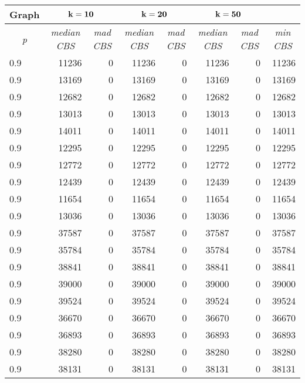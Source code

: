 \documentclass{scrartcl}
\theoremstyle{plain}
\newcommand{\cbs}{CBS}
\begin{document}
\begin{table}[!ht]
	\centering
	\scriptsize
	\begin{tabular}{|l|rr|rr|rr|r|}
	\hline
\multicolumn{1}{|c|}{\textbf{Graph}} & \multicolumn{2}{c|}{$\bf{k=10}$} & 
\multicolumn{2}{c|}{$\bf{k=20}$} &  \multicolumn{2}{c|}{$\bf{k=50}$} & \\ 
\hline	

\multicolumn{1}{|c|}{\emph{p}} &
\multicolumn{1}{c}{\emph{median \cbs{}}} & \multicolumn{1}{c|}{\emph{mad 
\cbs{}}} &
\multicolumn{1}{c}{\emph{median \cbs{}}} & \multicolumn{1}{c|}{\emph{mad 
\cbs{}}} &
\multicolumn{1}{c}{\emph{median \cbs{}}} & \multicolumn{1}{c|}{\emph{mad 
\cbs{}}} &
\multicolumn{1}{|c|}{\emph{min \cbs{}}}

\\ \hline

\makeatletter{}0.9 & 11236 & 0 & 11236 & 0 & 11236 & 0 & 11236 \\ 
0.9 & 13169 & 0 & 13169 & 0 & 13169 & 0 & 13169 \\ 
0.9 & 12682 & 0 & 12682 & 0 & 12682 & 0 & 12682 \\ 
0.9 & 13013 & 0 & 13013 & 0 & 13013 & 0 & 13013 \\ 
0.9 & 14011 & 0 & 14011 & 0 & 14011 & 0 & 14011 \\ 
0.9 & 12295 & 0 & 12295 & 0 & 12295 & 0 & 12295 \\ 
0.9 & 12772 & 0 & 12772 & 0 & 12772 & 0 & 12772 \\ 
0.9 & 12439 & 0 & 12439 & 0 & 12439 & 0 & 12439 \\ 
0.9 & 11654 & 0 & 11654 & 0 & 11654 & 0 & 11654 \\ 
0.9 & 13036 & 0 & 13036 & 0 & 13036 & 0 & 13036 \\ 
0.9 & 37587 & 0 & 37587 & 0 & 37587 & 0 & 37587 \\ 
0.9 & 35784 & 0 & 35784 & 0 & 35784 & 0 & 35784 \\ 
0.9 & 38841 & 0 & 38841 & 0 & 38841 & 0 & 38841 \\ 
0.9 & 39000 & 0 & 39000 & 0 & 39000 & 0 & 39000 \\ 
0.9 & 39524 & 0 & 39524 & 0 & 39524 & 0 & 39524 \\ 
0.9 & 36670 & 0 & 36670 & 0 & 36670 & 0 & 36670 \\ 
0.9 & 36893 & 0 & 36893 & 0 & 36893 & 0 & 36893 \\ 
0.9 & 38280 & 0 & 38280 & 0 & 38280 & 0 & 38280 \\ 
0.9 & 38131 & 0 & 38131 & 0 & 38131 & 0 & 38131 \\ 

\end{tabular}
\end{table}
\end{document}
